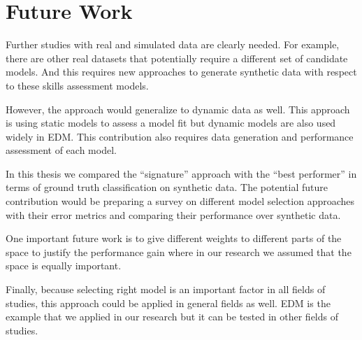 \section{Future Work}

Further studies with real and simulated data are clearly needed.  For example, there are other real datasets that potentially require a different set of candidate models. And this requires new approaches to generate synthetic data with respect to these skills assessment models.


However, the approach would generalize to dynamic data as well. This approach is using static models to assess a model fit but dynamic models are also used widely in EDM. This contribution also requires data generation and performance assessment of each model.


In this thesis we compared the ``signature'' approach with the ``best performer'' in terms of ground truth classification on synthetic data. The potential future contribution would be preparing a survey on different model selection approaches with their error metrics and comparing their performance over synthetic data.


One important future work is to give different weights to different parts of the space to justify the performance gain where in our research we assumed that the space is equally important.

Finally, because selecting right model is an important factor in all fields of studies, this approach could be applied in general fields as well. EDM is the example that we applied in our research but it can be tested in other fields of studies.
